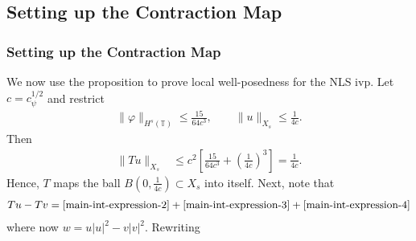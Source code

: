 \documentclass[handout]{beamer}
\numberwithin{equation}{section}
\newcommand{\ci}{\mathbb{T}}
\newcommand{\vp}{\varphi}
\begin{document}
\subsection{Setting up the Contraction Map}
\begin{frame}
	\frametitle{Setting up the Contraction Map}

We now use the proposition to prove local well-posedness for the 
NLS ivp. Let $c = c_\psi^{1/2}$ and restrict 
%
\begin{equation*}
	\begin{split}
		\|\vp\|_{H^s(\ci)} \le \frac{15}{64c^3}, \qquad \|u\|_{X_s} \le 
		\frac{1}{4c}.
	\end{split}
\end{equation*}
%
Then
%
\begin{equation*}
	\begin{split}
		\|T u \|_{X_s} 
		& \le c^2 \left[ \frac{15}{64c^3} + \left( 
		\frac{1}{4c} \right)^3 \right]
		=  \frac{1}{4c}.
	\end{split}
\end{equation*}
%
Hence, $T$ maps the ball $B\left( 0, \frac{1}{4c} \right) \subset X_s$ into 
itself. Next, note that
%
\begin{equation*}
	\begin{split}
		Tu - Tv = \eqref{main-int-expression-2} + \eqref{main-int-expression-3} 
		+ \eqref{main-int-expression-4}
	\end{split}
\end{equation*}
%
where now $w = u | u |^2 - v | v |^{2}$. Rewriting

\end{frame}
\end{document}
